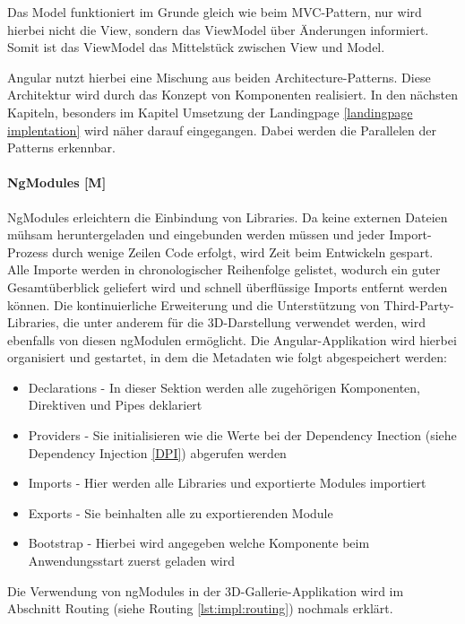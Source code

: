 Das Model funktioniert im Grunde gleich wie beim MVC-Pattern, nur wird hierbei nicht die View, sondern das ViewModel über Änderungen informiert. Somit ist das ViewModel das Mittelstück zwischen View und Model.

Angular nutzt hierbei eine Mischung aus beiden Architecture-Patterns. Diese Architektur wird durch das Konzept von Komponenten realisiert. In den nächsten Kapiteln, besonders im Kapitel Umsetzung der Landingpage \ref{landingpage implentation} wird näher darauf eingegangen. Dabei werden die Parallelen der Patterns erkennbar.
\cite{MVVM}

\paragraph{NgModules [M]}\label{sec:NgModules}
NgModules erleichtern die Einbindung von Libraries. Da keine externen Dateien mühsam heruntergeladen und eingebunden werden müssen und jeder Import-Prozess durch wenige Zeilen Code erfolgt, wird Zeit beim Entwickeln gespart. Alle Importe werden in chronologischer Reihenfolge gelistet, wodurch ein guter Gesamtüberblick geliefert wird und schnell überflüssige Imports entfernt werden können. Die kontinuierliche Erweiterung und die Unterstützung von Third-Party-Libraries, die unter anderem für die 3D-Darstellung verwendet werden, wird ebenfalls von diesen ngModulen ermöglicht. Die Angular-Applikation wird hierbei organisiert und gestartet, in dem die Metadaten wie folgt abgespeichert werden:

\begin{itemize}
  \item Declarations - In dieser Sektion werden alle zugehörigen Komponenten, Direktiven und Pipes deklariert 
  \item Providers - Sie initialisieren wie die Werte bei der Dependency Inection (siehe Dependency Injection \ref{DPI}) abgerufen werden \cite{AngularProviders}
  \item Imports - Hier werden alle Libraries und exportierte Modules importiert
  \item Exports - Sie beinhalten alle zu exportierenden Module
  \item Bootstrap - Hierbei wird angegeben welche Komponente beim Anwendungsstart zuerst geladen wird
\end{itemize}

Die Verwendung von ngModules in der 3D-Gallerie-Applikation wird im Abschnitt Routing (siehe Routing \ref{lst:impl:routing}) nochmals erklärt.
\cite{AngularNgModules}
\cite{AngularNgModulesAPI}
\cite{AngularBuch}


